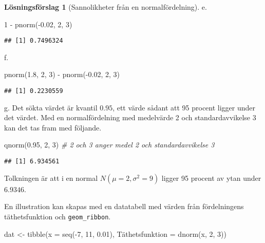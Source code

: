 \documentclass[
]{book}
\newenvironment{Shaded}{\begin{snugshade}}{\end{snugshade}}
\newcommand{\AttributeTok}[1]{\textcolor[rgb]{0.77,0.63,0.00}{#1}}
\newcommand{\CommentTok}[1]{\textcolor[rgb]{0.56,0.35,0.01}{\textit{#1}}}
\newcommand{\DecValTok}[1]{\textcolor[rgb]{0.00,0.00,0.81}{#1}}
\newcommand{\FloatTok}[1]{\textcolor[rgb]{0.00,0.00,0.81}{#1}}
\newcommand{\FunctionTok}[1]{\textcolor[rgb]{0.00,0.00,0.00}{#1}}
\newcommand{\NormalTok}[1]{#1}
\newcommand{\OtherTok}[1]{\textcolor[rgb]{0.56,0.35,0.01}{#1}}
\newcommand{\SpecialCharTok}[1]{\textcolor[rgb]{0.00,0.00,0.00}{#1}}
\theoremstyle{definition}
\theoremstyle{definition}
\theoremstyle{definition}
\theoremstyle{definition}
\newtheorem{hypothesis}{Lösningsförslag}[chapter]
\theoremstyle{remark}
\begin{document}
\begin{hypothesis}[Sannolikheter från en normalfördelning]
e.

\begin{Shaded}
\begin{Highlighting}[]
\DecValTok{1} \SpecialCharTok{{-}} \FunctionTok{pnorm}\NormalTok{(}\SpecialCharTok{{-}}\FloatTok{0.02}\NormalTok{, }\DecValTok{2}\NormalTok{, }\DecValTok{3}\NormalTok{)}
\end{Highlighting}
\end{Shaded}

\begin{verbatim}
## [1] 0.7496324
\end{verbatim}

f.

\begin{Shaded}
\begin{Highlighting}[]
\FunctionTok{pnorm}\NormalTok{(}\FloatTok{1.8}\NormalTok{, }\DecValTok{2}\NormalTok{, }\DecValTok{3}\NormalTok{) }\SpecialCharTok{{-}} \FunctionTok{pnorm}\NormalTok{(}\SpecialCharTok{{-}}\FloatTok{0.02}\NormalTok{, }\DecValTok{2}\NormalTok{, }\DecValTok{3}\NormalTok{)}
\end{Highlighting}
\end{Shaded}

\begin{verbatim}
## [1] 0.2230559
\end{verbatim}

g. Det sökta värdet är kvantil \(0.95\), ett värde sådant att 95 procent ligger under det värdet. Med en normalfördelning med medelvärde 2 och standardavvikelse 3 kan det tas fram med följande.

\begin{Shaded}
\begin{Highlighting}[]
\FunctionTok{qnorm}\NormalTok{(}\FloatTok{0.95}\NormalTok{, }\DecValTok{2}\NormalTok{, }\DecValTok{3}\NormalTok{) }\CommentTok{\# 2 och 3 anger medel 2 och standardavvikelse 3}
\end{Highlighting}
\end{Shaded}

\begin{verbatim}
## [1] 6.934561
\end{verbatim}

Tolkningen är att i en normal \(N(\mu = 2, \sigma^2 = 9)\) ligger 95 procent av ytan under \(6.9346\).

En illustration kan skapas med en datatabell med värden från fördelningens täthetsfunktion och \texttt{geom\_ribbon}.

\begin{Shaded}
\begin{Highlighting}[]
\NormalTok{dat }\OtherTok{\textless{}{-}} \FunctionTok{tibble}\NormalTok{(}\AttributeTok{x =} \FunctionTok{seq}\NormalTok{(}\SpecialCharTok{{-}}\DecValTok{7}\NormalTok{, }\DecValTok{11}\NormalTok{, }\FloatTok{0.01}\NormalTok{),}
\NormalTok{              Täthetsfunktion }\OtherTok{=} \FunctionTok{dnorm}\NormalTok{(x, }\DecValTok{2}\NormalTok{, }\DecValTok{3}\NormalTok{))}


\end{Highlighting}
\end{Shaded}
\end{hypothesis}
\end{document}
